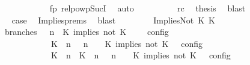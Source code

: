 \begin{isabellebody}
\ \ \ \ \ \ \ \ \ \ \isamarkupfalse%
\ fp\ relpowp{\isacharunderscore}Suc{\isacharunderscore}I{}\ \isamarkupfalse%
\ auto\isanewline
\ \ \ \ \ \ \ \ \isamarkupfalse%
\ rc\ \isamarkupfalse%
\ {\isacharquery}thesis\ \isamarkupfalse%
\ blast\isanewline
\ \ \ \ \ \ \isamarkupfalse%
\isanewline
\ \ \ \ \ \ \isamarkupfalse%
\ \isamarkupfalse%
\ {\isacharquery}case\ \isamarkupfalse%
\ Implies{\isachardot}prems{\isacharparenleft}{}{\isacharparenright}\ \isamarkupfalse%
\ blast\isanewline
\ \ \isamarkupfalse%
\isanewline
\ \ \ \ \isamarkupfalse%
\ {\isacharparenleft}ImpliesNot\ K\ K\isanewline
\ \ \ \ \ \ \isamarkupfalse%
\ branches{\isacharcolon}\ {\isacartoucheopen}{\isasymlbrakk}\ {\isasymGamma}{\isacharcomma}\ n\ {\isasymturnstile}\ {\isacharparenleft}{\isacharparenleft}K\ implies\ not\ K\ {\isacharhash}\ {\isasymPsi}{\isacharparenright}\ {\isasymtriangleright}\ {\isasymPhi}\ {\isasymrbrakk}\isactrlsub c\isactrlsub o\isactrlsub n\isactrlsub f\isactrlsub i\isactrlsub g\isanewline
\ \ \ \ \ \ \ \ \ \ {\isacharequal}\ {\isasymlbrakk}\ {\isacharparenleft}{\isacharparenleft}K\ {\isasymnot}{\isasymUp}\ n{\isacharparenright}\ {\isacharhash}\ {\isasymGamma}{\isacharparenright}{\isacharcomma}\ n\ {\isasymturnstile}\ {\isasymPsi}\ {\isasymtriangleright}\ {\isacharparenleft}{\isacharparenleft}K\ implies\ not\ K\ {\isacharhash}\ {\isasymPhi}{\isacharparenright}\ {\isasymrbrakk}\isactrlsub c\isactrlsub o\isactrlsub n\isactrlsub f\isactrlsub i\isactrlsub g\isanewline
\ \ \ \ \ \ \ \ \ \ {\isasymunion}\ {\isasymlbrakk}\ {\isacharparenleft}{\isacharparenleft}K\ {\isasymUp}\ n{\isacharparenright}\ {\isacharhash}\ {\isacharparenleft}K\ {\isasymnot}{\isasymUp}\ n{\isacharparenright}\ {\isacharhash}\ {\isasymGamma}{\isacharparenright}{\isacharcomma}\ n\ {\isasymturnstile}\ {\isasymPsi}\ {\isasymtriangleright}\ {\isacharparenleft}{\isacharparenleft}K\ implies\ not\ K\ {\isacharhash}\ {\isasymPhi}{\isacharparenright}\ {\isasymrbrakk}\isactrlsub c\isactrlsub o\isactrlsub n\isactrlsub f\isactrlsub i\isactrlsub g{\isacartoucheclose}\isanewline

\end{isabellebody}
